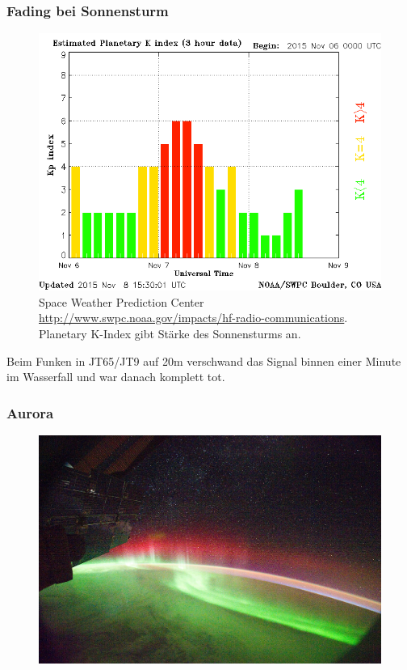 \begin{frame}
  \frametitle{Fading bei Sonnensturm}
  \begin{center}
    \begin{figure}
      \includegraphics[width=.8\textwidth,height=.55\textheight,keepaspectratio]{e09/planetary-k-index.png}
      \caption{Space Weather Prediction Center \ExternalLink \url{http://www.swpc.noaa.gov/impacts/hf-radio-communications}.  Planetary K-Index gibt Stärke des Sonnensturms an.}
    \end{figure}
    Beim Funken in JT65/JT9 auf 20m verschwand das Signal binnen einer Minute im Wasserfall und war danach komplett tot.
  \end{center}
\end{frame}

\begin{frame}
  \frametitle{Aurora}
  \begin{center}
    \begin{figure}
      \includegraphics[width=.9\textwidth,height=.75\textheight,keepaspectratio]{e09/Aurora_Seen_From_Space_by_NASA.jpg}
    \end{figure}
  \end{center}
\end{frame}

